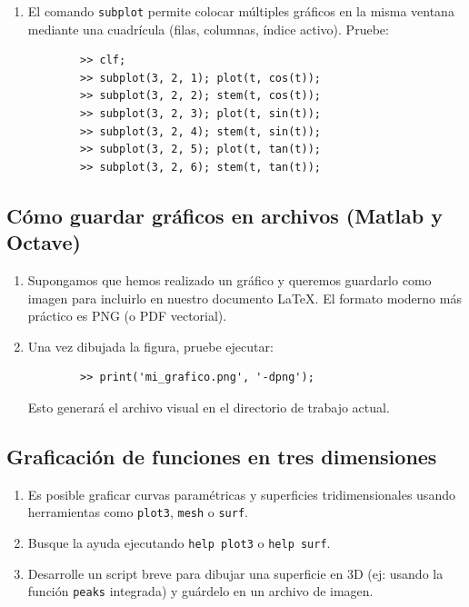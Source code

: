 \documentclass[11pt,a4paper,openany]{book}
\begin{document}
\begin{enumerate}
	\item El comando \texttt{subplot} permite colocar múltiples gráficos en la misma ventana mediante una cuadrícula (filas, columnas, índice activo). Pruebe:
	\begin{verbatim}
		>> clf;
		>> subplot(3, 2, 1); plot(t, cos(t));
		>> subplot(3, 2, 2); stem(t, cos(t));
		>> subplot(3, 2, 3); plot(t, sin(t));
		>> subplot(3, 2, 4); stem(t, sin(t));
		>> subplot(3, 2, 5); plot(t, tan(t));
		>> subplot(3, 2, 6); stem(t, tan(t));
	\end{verbatim}
	
\end{enumerate}

\subsection{Cómo guardar gráficos en archivos (Matlab y Octave)}

\begin{enumerate}
	
	\item Supongamos que hemos realizado un gráfico y queremos guardarlo como imagen para incluirlo en nuestro documento LaTeX. El formato moderno más práctico es PNG (o PDF vectorial).
	
	\item Una vez dibujada la figura, pruebe ejecutar:
	\begin{verbatim}
		>> print('mi_grafico.png', '-dpng');
	\end{verbatim}
	Esto generará el archivo visual en el directorio de trabajo actual. 
\end{enumerate}

\subsection{Graficación de funciones en tres dimensiones}

\begin{enumerate}
	\item Es posible graficar curvas paramétricas y superficies tridimensionales usando herramientas como \texttt{plot3}, \texttt{mesh} o \texttt{surf}.
	
	\item Busque la ayuda ejecutando \texttt{help plot3} o \texttt{help surf}.
	
	\item Desarrolle un script breve para dibujar una superficie en 3D (ej: usando la función \texttt{peaks} integrada) y guárdelo en un archivo de imagen.
\end{enumerate}
\end{document}
